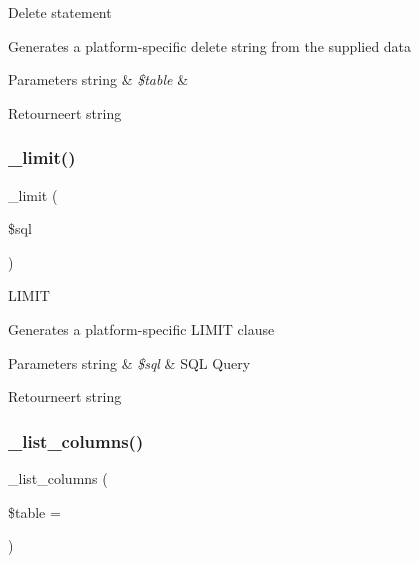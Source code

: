 Delete statement

Generates a platform-\/specific delete string from the supplied data


\begin{DoxyParams}[1]{Parameters}
string & {\em \$table} & \\
\hline
\end{DoxyParams}
\begin{DoxyReturn}{Retourneert}
string 
\end{DoxyReturn}
\mbox{\label{class_c_i___d_b__pdo__pgsql__driver_a3a02ea06541b8ecc25a33a61651562c8}} 
\subsubsection{\texorpdfstring{\_limit()}{\_limit()}}
{\footnotesize\ttfamily \+\_\+limit (\begin{DoxyParamCaption}\item[{}]{\$sql }\end{DoxyParamCaption})\hspace{0.3cm}{\ttfamily [protected]}}

L\+I\+M\+IT

Generates a platform-\/specific L\+I\+M\+IT clause


\begin{DoxyParams}[1]{Parameters}
string & {\em \$sql} & S\+QL Query \\
\hline
\end{DoxyParams}
\begin{DoxyReturn}{Retourneert}
string 
\end{DoxyReturn}
\mbox{\label{class_c_i___d_b__pdo__pgsql__driver_a7ccb7f9c301fe7f0a9db701254142b63}} 
\subsubsection{\texorpdfstring{\_list\_columns()}{\_list\_columns()}}
{\footnotesize\ttfamily \+\_\+list\+\_\+columns (\begin{DoxyParamCaption}\item[{}]{\$table = {\ttfamily \textquotesingle{}\textquotesingle{}} }\end{DoxyParamCaption})\hspace{0.3cm}{\ttfamily [protected]}}

